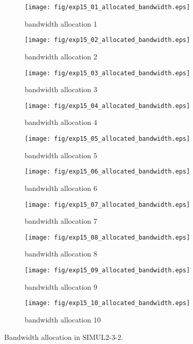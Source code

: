 	\begin{figure}
		\begin{center}
			\begin{subfigure}[b]{0.32\textwidth}
				\texttt{[image: fig/exp15\_01\_allocated\_bandwidth.eps]}
				\caption{bandwidth allocation 1}
				\label{figure:simul2_3_2_b_a}
			\end{subfigure}
			\begin{subfigure}[b]{0.32\textwidth}
				\texttt{[image: fig/exp15\_02\_allocated\_bandwidth.eps]}
				\caption{bandwidth allocation 2}
				\label{figure:simul2_3_2_b_b}
			\end{subfigure}
			\begin{subfigure}[b]{0.32\textwidth}
				\texttt{[image: fig/exp15\_03\_allocated\_bandwidth.eps]}
				\caption{bandwidth allocation 3}
				\label{figure:simul2_3_2_b_c}
			\end{subfigure}
			\begin{subfigure}[b]{0.32\textwidth}
				\texttt{[image: fig/exp15\_04\_allocated\_bandwidth.eps]}
				\caption{bandwidth allocation 4}
				\label{figure:simul2_3_2_b_d}
			\end{subfigure}
			\begin{subfigure}[b]{0.32\textwidth}
				\texttt{[image: fig/exp15\_05\_allocated\_bandwidth.eps]}
				\caption{bandwidth allocation 5}
				\label{figure:simul2_3_2_b_e}
			\end{subfigure}
			\begin{subfigure}[b]{0.32\textwidth}
				\texttt{[image: fig/exp15\_06\_allocated\_bandwidth.eps]}
				\caption{bandwidth allocation 6}
				\label{figure:simul2_3_2_b_f}
			\end{subfigure}
			\begin{subfigure}[b]{0.32\textwidth}
				\texttt{[image: fig/exp15\_07\_allocated\_bandwidth.eps]}
				\caption{bandwidth allocation 7}
				\label{figure:simul2_3_2_b_g}
			\end{subfigure}
			\begin{subfigure}[b]{0.32\textwidth}
				\texttt{[image: fig/exp15\_08\_allocated\_bandwidth.eps]}
				\caption{bandwidth allocation 8}
				\label{figure:simul2_3_2_b_h}
			\end{subfigure}
			\begin{subfigure}[b]{0.32\textwidth}
				\texttt{[image: fig/exp15\_09\_allocated\_bandwidth.eps]}
				\caption{bandwidth allocation 9}
				\label{figure:simul2_3_2_b_i}
			\end{subfigure}
			\begin{subfigure}[b]{0.32\textwidth}
				\texttt{[image: fig/exp15\_10\_allocated\_bandwidth.eps]}
				\caption{bandwidth allocation 10}
				\label{figure:simul2_3_2_b_j}
			\end{subfigure}
			\caption{Bandwidth allocation in SIMUL2-3-2.}
			\label{figure:simul2_3_2_ba}
		\end{center}
	\end{figure}


